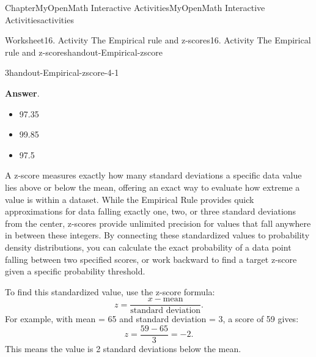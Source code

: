 \documentclass[oneside,10pt,]{book}
\newcommand{\blocktitlefont}{\relax}
\newcommand{\ptxlistdisc}{\raisebox{0.3ex}{\textbullet}}
\newlength{\fillinmaxwidth}
\newlength{\fillincontract}
\newlength{\charmaxwidth}\setlength{\charmaxwidth}{0.5em}
\newlength{\charminwidth}\setlength{\charminwidth}{0.1em}
\newlength{\fillinheight}
\newcommand{\fillintext}[1]{%
\setlength{\fillinmaxwidth}{#1\charmaxwidth}%
\setlength{\fillincontract}{#1\charminwidth}%
\setlength{\fillinheight}{\baselineskip}\addtolength{\fillinheight}{1.2pt}%
\strut\nobreak\leaders\vbox{\hrule width 0.3pt height 0.3pt \vskip -1.2pt}\hskip 1\fillinmaxwidth minus \fillincontract\nobreak\strut%
}
\begin{document}
\begin{chapterptx}{Chapter}{MyOpenMath Interactive Activities}{}{MyOpenMath Interactive Activities}{}{}{activities}
\begin{worksheet-section}{Worksheet}{16. Activity The Empirical rule and z-scores}{}{16. Activity The Empirical rule and z-scores}{}{}{handout-Empirical-zscore}
\begin{divisionexercise}{3}{}{}{handout-Empirical-zscore-4-1}
%
\par\smallskip%
\noindent\textbf{\blocktitlefont Answer}.\hypertarget{handout-Empirical-zscore-4-1-2}{}\quad{}%
\begin{itemize}[label=\ptxlistdisc]
\item{}97.35%
\item{}99.85%
\item{}97.5%
\end{itemize}
%
\end{divisionexercise}%
\clearpage
A z-score measures exactly how many standard deviations a specific data value lies above or below the mean, offering an exact way to evaluate how extreme a value is within a dataset. While the Empirical Rule provides quick approximations for data falling exactly one, two, or three standard deviations from the center, z-scores provide unlimited precision for values that fall anywhere in between these integers. By connecting these standardized values to probability density distributions, you can calculate the exact probability of a data point falling between two specified scores, or work backward to find a target z-score given a specific probability threshold.%
\par
To find this standardized value, use the z-score formula:%
\begin{equation*}
z = \frac{x - \text{mean}}{\text{standard deviation}}\text{.}
\end{equation*}
For example, with mean = 65 and standard deviation = 3, a score of 59 gives:%
\begin{equation*}
z = \frac{59 - 65}{3} = -2\text{.}
\end{equation*}
This means the value is 2 standard deviations below the mean.%

\end{worksheet-section}
\end{chapterptx}
\end{document}
